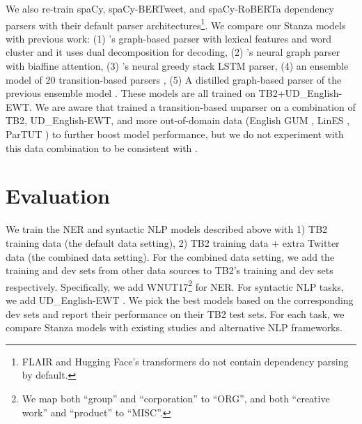 \documentclass[10pt, a4paper]{article}
\begin{document}
We also re-train spaCy, spaCy-BERTweet, and spaCy-RoBERTa dependency parsers with their default parser architectures\footnote{FLAIR and Hugging Face's transformers do not contain dependency parsing by default. }. We compare our Stanza models with previous work: (1) 's graph-based parser with lexical features and word cluster and it uses dual decomposition for decoding, (2) 's neural graph parser with biaffine attention, (3) 's neural greedy stack LSTM parser, (4) an ensemble model of 20 transition-based parsers \cite{liu2018parsing}, (5) A distilled graph-based parser of the previous ensemble model \cite{liu2018parsing}. These models are all trained on TB2+UD\_English-EWT. We are aware that  trained a transition-based uuparser \cite{de2017raw} on a combination of TB2, UD\_English-EWT, and more out-of-domain data (English GUM \cite{Zeldes2017}, LinES \cite{ahrenberg-2007-lines}, ParTUT \cite{sanguinetti2015parttut}) to further boost model performance, but we do not experiment with this data combination to be consistent with . 





















\section{Evaluation}
We train the NER and syntactic NLP models described above with 1) TB2 training data (the default data setting), 2) TB2 training data + extra Twitter data (the combined data setting). For the combined data setting, we add the training and dev sets from other data sources to TB2's training and dev sets respectively. Specifically, we add WNUT17\footnote{We map both ``group'' and ``corporation'' to ``ORG'', and both ``creative work'' and ``product'' to ``MISC''. }  \cite{ws-2017-noisy} for NER. For syntactic NLP tasks, we add UD\_English-EWT . We pick the best models based on the corresponding dev sets and report their performance on their TB2 test sets. For each task, we compare Stanza models with existing studies and alternative NLP frameworks. 
\end{document}
